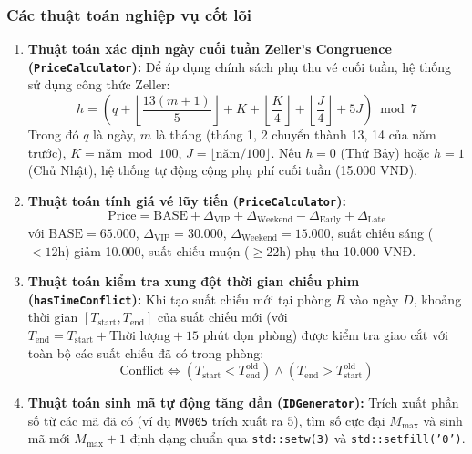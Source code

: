 \documentclass[12pt,a4paper]{article}
\begin{document}
\subsubsection{Các thuật toán nghiệp vụ cốt lõi}
\begin{enumerate}
    \item \textbf{Thuật toán xác định ngày cuối tuần Zeller's Congruence (\texttt{PriceCalculator}):}
    Để áp dụng chính sách phụ thu vé cuối tuần, hệ thống sử dụng công thức Zeller:
    \begin{equation}
        h = \left( q + \left\lfloor \frac{13(m+1)}{5} \right\rfloor + K + \left\lfloor \frac{K}{4} \right\rfloor + \left\lfloor \frac{J}{4} \right\rfloor + 5J \right) \bmod 7
    \end{equation}
    Trong đó $q$ là ngày, $m$ là tháng (tháng 1, 2 chuyển thành 13, 14 của năm trước), $K = \text{năm} \bmod 100$, $J = \lfloor\text{năm} / 100\rfloor$. Nếu $h = 0$ (Thứ Bảy) hoặc $h = 1$ (Chủ Nhật), hệ thống tự động cộng phụ phí cuối tuần (15.000 VNĐ).
    \item \textbf{Thuật toán tính giá vé lũy tiến (\texttt{PriceCalculator}):}
    \begin{equation}
        \text{Price} = \text{BASE} + \Delta_{\text{VIP}} + \Delta_{\text{Weekend}} - \Delta_{\text{Early}} + \Delta_{\text{Late}}
    \end{equation}
    với $\text{BASE} = 65.000$, $\Delta_{\text{VIP}} = 30.000$, $\Delta_{\text{Weekend}} = 15.000$, suất chiếu sáng ($< 12\text{h}$) giảm 10.000, suất chiếu muộn ($\ge 22\text{h}$) phụ thu 10.000 VNĐ.
    \item \textbf{Thuật toán kiểm tra xung đột thời gian chiếu phim (\texttt{hasTimeConflict}):}
    Khi tạo suất chiếu mới tại phòng $R$ vào ngày $D$, khoảng thời gian $[T_{\text{start}}, T_{\text{end}}]$ của suất chiếu mới (với $T_{\text{end}} = T_{\text{start}} + \text{Thời lượng} + 15\text{ phút dọn phòng}$) được kiểm tra giao cắt với toàn bộ các suất chiếu đã có trong phòng:
    \begin{equation}
        \text{Conflict} \iff (T_{\text{start}} < T_{\text{end}}^{\text{old}}) \land (T_{\text{end}} > T_{\text{start}}^{\text{old}})
    \end{equation}
    \item \textbf{Thuật toán sinh mã tự động tăng dần (\texttt{IDGenerator}):}
    Trích xuất phần số từ các mã đã có (ví dụ \texttt{MV005} trích xuất ra $5$), tìm số cực đại $M_{\max}$ và sinh mã mới $M_{\max} + 1$ định dạng chuẩn qua \texttt{std::setw(3)} và \texttt{std::setfill('0')}.
\end{enumerate}
\end{document}
